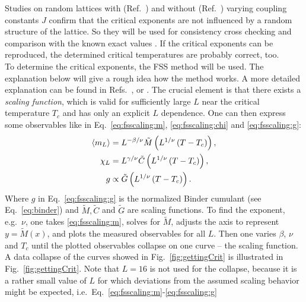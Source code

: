     Studies on random lattices with (Ref.\ \cite{Lima2000}) and without (Ref.\ \cite{Janke1994})
    varying coupling constants \(J\) confirm that the
    critical exponents are not influenced by a random structure of the lattice.
    So they will be used for consistency cross checking and
    comparison with the known exact values \cite[p. 59]{Pelissetto2002}.
    If the critical exponents can be reproduced, the determined critical
    temperatures are probably correct, too.\\
    To determine the critical exponents, the FSS method
    will be used. The explanation below will give a rough idea how
    the method works. A more detailed explanation can be found in Refs.\ \cite{Norrenbrock2011}, \cite{DMelchert2009} or \cite{Binder2010}.
    The crucial element is that there exists a \emph{scaling function},
    which is valid for sufficiently large \(L\) near the critical
    temperature \(T_{c}\) and has only an explicit \(L\) dependence.
    One can then express some observables like in Eq.\ \eqref{eq:fsscaling:m}, \eqref{eq:fsscaling:chi} and
    \eqref{eq:fsscaling:g}:
    \begin{align}
        \label{eq:fsscaling:m}
        \left< m_L \right> &= L^{-{\beta/\nu}} \tilde{M}\left(L^{1/\nu}\left(T-T_c\right)\right),\\
        \label{eq:fsscaling:chi}
        \chi_L    &= L^{{\gamma/\nu}} \tilde{C}\left(L^{1/\nu}\left(T-T_c\right)\right),\\
        \label{eq:fsscaling:g}
        g         &\propto \tilde{G}\left(L^{1/\nu}\left(T-T_c\right)\right).
    \end{align}
    Where \(g\) in Eq.\ \eqref{eq:fsscaling:g} is the normalized
    Binder cumulant (see Eq.\ \eqref{eq:binder}) and \(\tilde{M}, \tilde{C}\) and \(\tilde{G}\)
    are scaling functions.
    To find the exponent, e.g.\ \(\nu\), one takes \eqref{eq:fsscaling:m},
    solves for \(\tilde{M}\), adjusts the axis to represent \(y=\tilde{M}(x)\),
    and plots the measured observables for all \(L\).
    Then one varies \(\beta\), \(\nu\) and \(T_{c}\) until the plotted observables
    collapse on one curve -- the scaling function.
    A data collapse of the curves showed in Fig.\ \ref{fig:gettingCrit}
    is illustrated in Fig.\ \ref{fig:gettingCrit}.
    Note that \(L=16\) is not used for the collapse, because it is a
    rather small value of \(L\) for which deviations from the assumed
    scaling behavior might be expected, i.e.\ Eq.\ \eqref{eq:fsscaling:m}-\eqref{eq:fsscaling:g}
